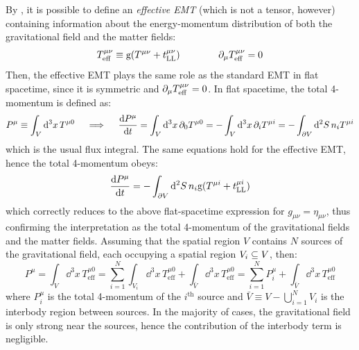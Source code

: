 By , it is possible to define an \emph{effective EMT} (which is not a tensor, however) containing information about the energy-momentum distribution of both the gravitational field and the matter fields:
\begin{equation}
  T_\text{eff}^{\mu \nu} \equiv \mathrm{g} (T^{\mu \nu} + t_\text{LL}^{\mu \nu})
  \qquad \qquad
  \partial_\mu T_\text{eff}^{\mu \nu} = 0
\end{equation}
Then, the effective EMT plays the same role as the standard EMT in flat spacetime, since it is symmetric and $ \partial_\mu T_\text{eff}^{\mu \nu} = 0 $. In flat spacetime, the total 4-momentum is defined as:
\begin{equation*}
  P^\mu \equiv \int_V \mathrm{d}^3x \, T^{\mu 0}
  \quad \implies \quad
  \frac{\mathrm{d} P^\mu}{\mathrm{d} t} = \int_V \mathrm{d}^3x \, \partial_0 T^{\mu 0} = - \int_V \mathrm{d}^3x \, \partial_i T^{\mu i} = - \int_{\partial V} \mathrm{d}^2S \, n_i T^{\mu i}
\end{equation*}
which is the usual flux integral. The same equations hold for the effective EMT, hence the total 4-momentum obeys:
\begin{equation}
  \frac{\mathrm{d} P^\mu}{\mathrm{d} t} = - \int_{\partial V} \mathrm{d}^2S \, n_i \mathrm{g} (T^{\mu i} + t_\text{LL}^{\mu i})
\end{equation}
which correctly reduces to the above flat-spacetime expression for $ g_{\mu \nu} = \eta_{\mu \nu} $, thus confirming the interpretation as the total 4-momentum of the gravitational fields and the matter fields. Assuming that the spatial region $ V $ contains $ N $ sources of the gravitational field, each occupying a spatial region $ V_i \subseteq V $, then:
\begin{equation*}
  P^\mu = \int_V \dd^3x \, T_\text{eff}^{\mu 0} = \sum_{i = 1}^N \int_{V_i} \dd^3x \, T_\text{eff}^{\mu 0} + \int_{\bar{V}} \dd^3x \, T_\text{eff}^{\mu 0} = \sum_{i = 1}^N P^\mu_i + \int_{\bar{V}} \dd^3x \, T_\text{eff}^{\mu 0}
\end{equation*}
where $ P^\mu_i $ is the total 4-momentum of the $ i^\text{th} $ source and $ \bar{V} \equiv V - \bigcup_{i = 1}^N V_i $ is the interbody region between sources. In the majority of cases, the gravitational field is only strong near the sources, hence the contribution of the interbody term is negligible.


